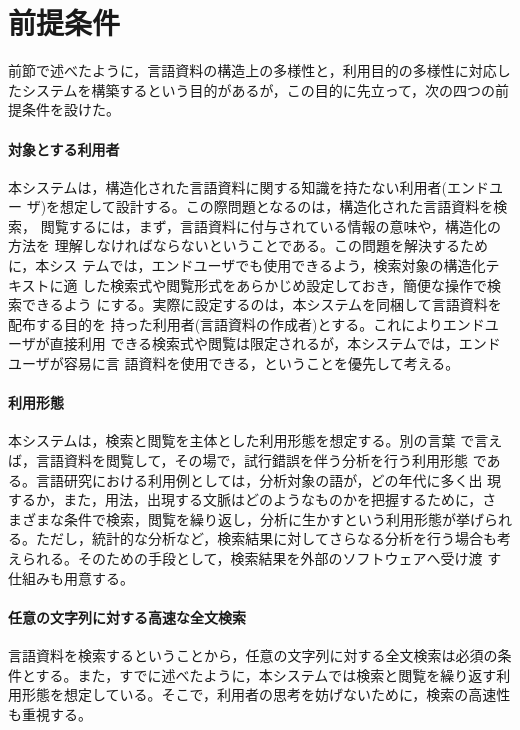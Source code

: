 \section{前提条件}
\label{sec:前提条件}
前節で述べたように，言語資料の構造上の多様性と，利用目的の多様性に対応し
たシステムを構築するという目的があるが，この目的に先立って，次の四つの前
提条件を設けた。


\paragraph{対象とする利用者}
本システムは，構造化された言語資料に関する知識を持たない利用者(エンドユー
ザ)を想定して設計する。この際問題となるのは，構造化された言語資料を検索，
閲覧するには，まず，言語資料に付与されている情報の意味や，構造化の方法を
理解しなければならないということである。この問題を解決するために，本シス
テムでは，エンドユーザでも使用できるよう，検索対象の構造化テキストに適
した検索式や閲覧形式をあらかじめ設定しておき，簡便な操作で検索できるよう
にする。実際に設定するのは，本システムを同梱して言語資料を配布する目的を
持った利用者(言語資料の作成者)とする。これによりエンドユーザが直接利用
できる検索式や閲覧は限定されるが，本システムでは，エンドユーザが容易に言
語資料を使用できる，ということを優先して考える。


\paragraph{利用形態}
本システムは，検索と閲覧を主体とした利用形態を想定する。別の言葉
で言えば，言語資料を閲覧して，その場で，試行錯誤を伴う分析を行う利用形態
である。言語研究における利用例としては，分析対象の語が，どの年代に多く出
現するか，また，用法，出現する文脈はどのようなものかを把握するために，さ
まざまな条件で検索，閲覧を繰り返し，分析に生かすという利用形態が挙げられ
る。ただし，統計的な分析など，検索結果に対してさらなる分析を行う場合も考
えられる。そのための手段として，検索結果を外部のソフトウェアへ受け渡
す仕組みも用意する。




\paragraph{任意の文字列に対する高速な全文検索}
言語資料を検索するということから，任意の文字列に対する全文検索は必須の条
件とする。また，すでに述べたように，本システムでは検索と閲覧を繰り返す利
用形態を想定している。そこで，利用者の思考を妨げないために，検索の高速性
も重視する。









